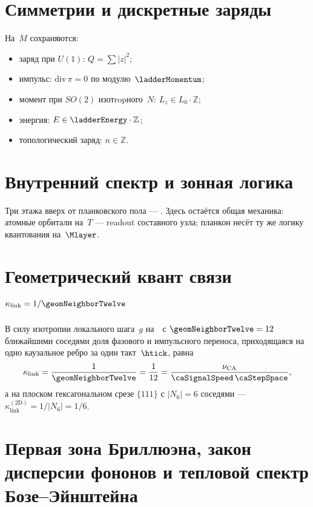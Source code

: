 \section{Симметрии и дискретные заряды}

\begin{proposition}
На~$M$ сохраняются:
\begin{itemize}
\item заряд при $U(1)$: $Q=\sum|z|^2$;
\item импульс: $\mathrm{div}\,\pi=0$ по модулю~$\ladderMomentum$;
\item момент при $SO(2)$ изотropного~$N$: $L_z\in L_0\cdot\mathbb{Z}$;
\item энергия: $E\in \ladderEnergy\cdot\mathbb{Z}$;
\item топологический заряд: $n\in\mathbb{Z}$.
\end{itemize}
\end{proposition}

\section{Внутренний спектр и зонная логика}
\label{sec:planckon-internal-spectrum}

Три этажа вверх от планковского пола --- .
Здесь остаётся общая механика: атомные орбитали на~$T$ --- readout составного узла;
планкон несёт ту же логику квантования на~$\Mlayer$.

\section{Геометрический квант связи \texorpdfstring{$\kappa_{\mathrm{link}}=1/\geomNeighborTwelve$}{kappa=1/|N|}}

\begin{proposition}
В силу изотропии локального шага~$g$ на~\latGCK\ с $\geomNeighborTwelve = 12$ ближайшими соседями доля фазового и импульсного переноса, приходящаяся на одно каузальное ребро за один такт~$\htick$, равна
\[
  \kappa_{\mathrm{link}} = \frac{1}{\geomNeighborTwelve} = \frac{1}{12} = \frac{\nu_{\mathrm{CA}}}{\caSignalSpeed\,\caStepSpace},
\]
а на плоском гексагональном срезе $\{111\}$ с $|N_6| = 6$ соседями --- $\kappa_{\mathrm{link}}^{(2\mathrm{D})} = 1/|N_6| = 1/6$.
\end{proposition}

\section{Первая зона Бриллюэна, закон дисперсии фононов и тепловой спектр Бозе--Эйнштейна}
\label{sec:phonons-bose-spectrum}

